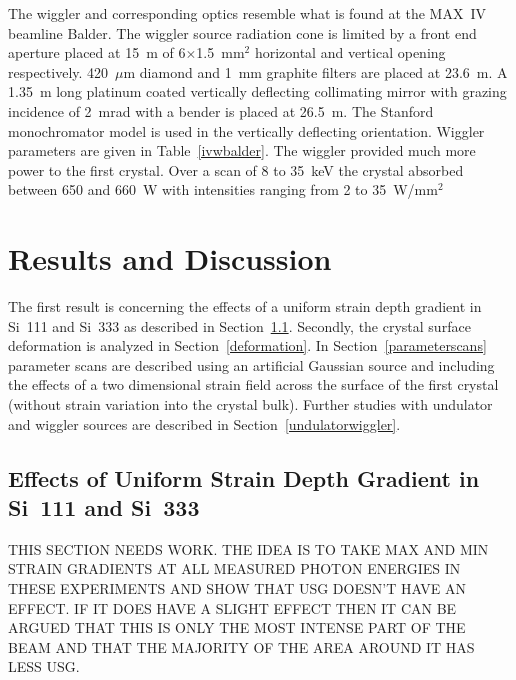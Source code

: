 \documentclass{iucr}
\begin{document}
The wiggler and corresponding optics resemble what is found at the MAX~IV beamline Balder. The wiggler source radiation cone is limited by a front end aperture placed at 15~m of 6$\times$1.5~mm$^2$ horizontal and vertical opening respectively. 420~$\mu$m diamond and 1~mm graphite filters are placed at 23.6~m. A 1.35~m long platinum coated vertically deflecting collimating mirror with grazing incidence of 2~mrad with a bender is placed at 26.5~m. The Stanford monochromator model is used in the vertically deflecting orientation. Wiggler parameters are given in Table~\ref{ivwbalder}. The wiggler provided much more power to the first crystal. Over a scan of 8 to 35~keV the crystal absorbed between 650 and 660~W with intensities ranging from 2 to 35~W/mm$^2$

\section{Results and Discussion}

The first result is concerning the effects of a uniform strain depth gradient in Si~111 and Si~333 as described in Section~\ref{strain_results}. Secondly, the crystal surface deformation is analyzed in Section~\ref{deformation}. In Section~\ref{parameterscans} parameter scans are described using an artificial Gaussian source and including the effects of a two dimensional strain field across the surface of the first crystal (without strain variation into the crystal bulk). Further studies with undulator and wiggler sources are described in Section~\ref{undulatorwiggler}.

\subsection{Effects of Uniform Strain Depth Gradient in Si~111 and Si~333}\label{strain_results}
THIS SECTION NEEDS WORK. THE IDEA IS TO TAKE MAX AND MIN STRAIN GRADIENTS AT ALL MEASURED PHOTON ENERGIES IN THESE EXPERIMENTS AND SHOW THAT USG DOESN'T HAVE AN EFFECT. IF IT DOES HAVE A SLIGHT EFFECT THEN IT CAN BE ARGUED THAT THIS IS ONLY THE MOST INTENSE PART OF THE BEAM AND THAT THE MAJORITY OF THE AREA AROUND IT HAS LESS USG.

\end{document}
